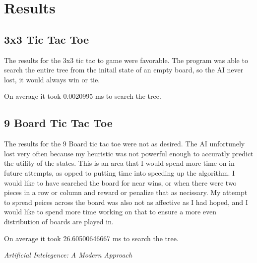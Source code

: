 \documentclass{article}
\begin{document}
\section{Results}
\subsection{3x3 Tic Tac Toe}
The results for the 3x3 tic tac to game were favorable. The program was able to search
the entire tree from the initail state of an empty board, so the AI never lost, it
would always win or tie.

On average it took 0.0020995 ms to search the tree.

\subsection{9 Board Tic Tac Toe}
The results for the 9 Board tic tac toe were not as desired. The AI unfortunely lost
very often because my heuristic was not powerful enough to accuratly predict the
utility of the states. This is an area that I would spend more time on in future
attempts, as opped to putting time into speeding up the algorithm. I would like to
have searched the board for near wins, or when there were two pieces in a row or column
and reward or penalize that as necissary. My attempt to spread peices across the
board was also not as affective as I had hoped, and I would like to spend more time
working on that to ensure a more even distribution of boards are played in.

On average it took 26.60500646667 ms to search the tree.





\textit{Artificial Intelegence: A Modern Approach}
\end{document}
